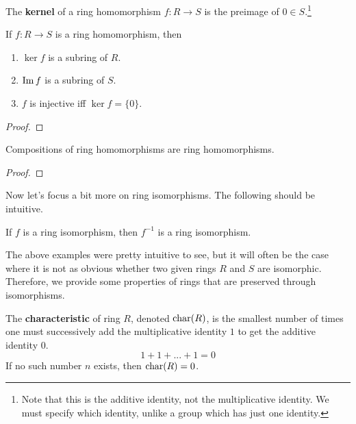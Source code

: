   \begin{definition}[Kernel]
    The \textbf{kernel} of a ring homomorphism $f: R \rightarrow S$ is the preimage of $0 \in S$.\footnote{Note that this is the additive identity, not the multiplicative identity. We must specify which identity, unlike a group which has just one identity.}
  \end{definition}

  \begin{lemma}
    If $f: R \rightarrow S$ is a ring homomorphism, then 
    \begin{enumerate}
      \item $\ker{f}$ is a subring of $R$. 
      \item $\operatorname{Im}{f}$ is a subring of $S$. 
      \item $f$ is injective iff $\ker{f} = \{0\}$. 
    \end{enumerate}
  \end{lemma}
  \begin{proof}

  \end{proof}

  \begin{theorem}
    Compositions of ring homomorphisms are ring homomorphisms. 
  \end{theorem} 
  \begin{proof}
    
  \end{proof}

  Now let's focus a bit more on ring isomorphisms. The following should be intuitive. 

  \begin{lemma}
    If $f$ is a ring isomorphism, then $f^{-1}$ is a ring isomorphism. 
  \end{lemma}

  The above examples were pretty intuitive to see, but it will often be the case where it is not as obvious whether two given rings $R$ and $S$ are isomorphic. Therefore, we provide some properties of rings that are preserved through isomorphisms. 

  \begin{definition}
    The \textbf{characteristic} of ring $R$, denoted $\operatorname{char}(R)$, is the smallest number of times one must successively add the multiplicative identity $1$ to get the additive identity $0$. 
    \begin{equation}
      1 + 1 + ... + 1 = 0 
    \end{equation}
    If no such number $n$ exists, then $\operatorname{char}(R) = 0$. 
  \end{definition}

